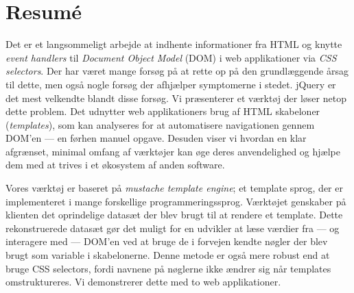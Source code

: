 \documentclass[thesis.tex]{subfiles}
\begin{document}
\chapter*{Resum\'e}
\label{chap:resume}

Det er et langsommeligt arbejde at indhente informationer fra HTML og
knytte \emph{event handlers} til \emph{Document Object Model} (DOM) i
web applikationer via \emph{CSS selectors}.
Der har været mange forsøg på at rette op på den grundlæggende årsag til dette,
men også nogle forsøg der afhjælper symptomerne i stedet.
jQuery er det mest velkendte blandt disse forsøg.
Vi præsenterer et værktøj der løser netop dette problem.
Det udnytter web applikationers brug af HTML skabeloner (\emph{templates}),
som kan analyseres for at automatisere navigationen gennem DOM'en
--- en førhen manuel opgave.
Desuden viser vi hvordan en klar afgrænset, minimal omfang af værktøjer
kan øge deres anvendelighed og hjælpe dem med at trives i et økosystem af
anden software.

Vores værktøj er baseret på \emph{mustache template engine}; et template sprog,
der er implementeret i mange forskellige programmeringssprog.
Værktøjet genskaber på klienten det oprindelige datasæt der blev brugt til at
rendere et template.
Dette rekonstruerede datasæt gør det muligt for en udvikler at læse værdier
fra --- og interagere med --- DOM'en ved at bruge de i forvejen kendte nøgler
der blev brugt som variable i skabelonerne.
Denne metode er også mere robust end at bruge CSS selectors,
fordi navnene på nøglerne ikke ændrer sig når templates omstruktureres.
Vi demonstrerer dette med to web applikationer.

\end{document}
